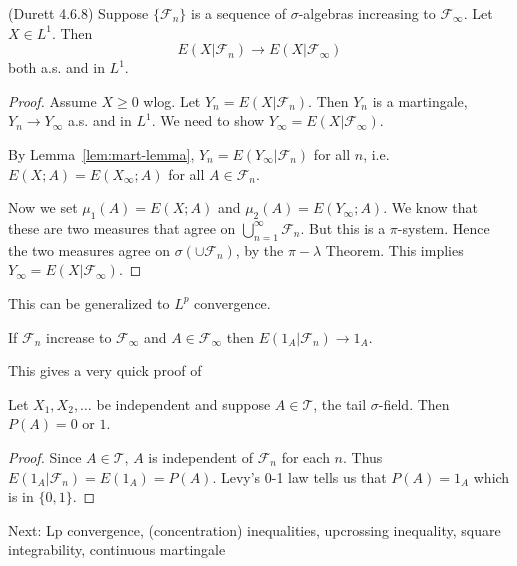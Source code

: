 \begin{theorem}
	(Durett 4.6.8)
	Suppose $\{\mathcal{F}_n\} $ is a sequence of $\sigma$-algebras increasing to $\mathcal{F}_\infty $. Let $X \in L^1$. Then
	\[
		E(X | \mathcal{F}_n ) \to  E(X | \mathcal{F}_\infty )
	\] 
	both a.s. and in $L^1$.
\end{theorem}
\begin{proof}
	Assume $X \ge 0$ wlog. Let $Y_n = E(X | \mathcal{F}_n)$. Then $Y_n$ is a martingale, $Y_n \to  Y_\infty $ a.s. and in $L^1$. We need to show $Y_\infty  = E(X | \mathcal{F}_\infty )$.

	By Lemma~\ref{lem:mart-lemma}, $Y_n = E(Y_\infty | \mathcal{F}_n)$ for all $n$, i.e. $E(X; A) = E(X_\infty ; A)$ for all $A \in \mathcal{F}_n$.
	
	Now we set $\mu_1(A) = E(X; A)$ and $\mu_2(A) = E(Y_\infty ; A)$. We know that these are two measures that agree on $\bigcup_{n = 1} ^\infty \mathcal{F}_n$. But this is a $\pi$-system. Hence the two measures agree on $\sigma\left( \cup \mathcal{F}_n \right) $, by the $\pi-\lambda$ Theorem.
	This implies $Y_\infty = E(X | \mathcal{F}_\infty )$.
\end{proof}

\begin{remark}
    This can be generalized to $L^p$ convergence.
\end{remark}

\begin{corollary}
	If $\mathcal{F}_n$ increase to  $\mathcal{F}_\infty $ and $A \in \mathcal{F}_\infty $ then $E(1_A | \mathcal{F}_n) \to 1_A$.
\end{corollary}

This gives a very quick proof of
\begin{corollary}
    Let $X_1, X_2, \dots$ be independent and suppose $A \in \mathcal{T}$, the tail $\sigma$-field. Then $P(A) = 0$ or $1$.
\end{corollary}
\begin{proof}
    Since $A \in \mathcal{T}$, $A$ is independent of $\mathcal{F}_n$ for each $n$. Thus $E(1_A | \mathcal{F}_n) = E(1_A) = P(A)$. Levy's 0-1 law tells us that $P(A) = 1_A$ which is in $\{0, 1\}$.
\end{proof}

Next: Lp convergence, (concentration) inequalities, upcrossing inequality, square integrability, continuous martingale